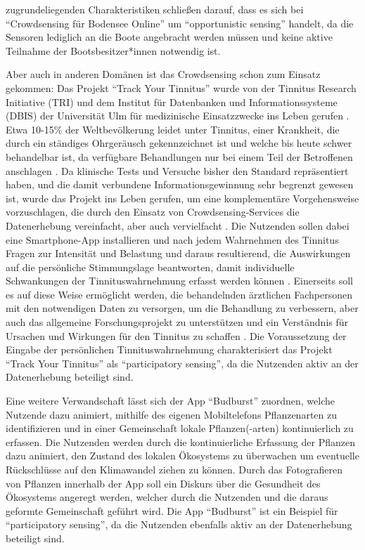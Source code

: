 zugrundeliegenden Charakteristiken schließen darauf, dass es sich bei \enquote{Crowdsensing für Bodensee Online} um \enquote{opportunistic sensing} handelt, da die Sensoren lediglich an die Boote angebracht werden müssen und keine aktive Teilnahme der Bootsbesitzer*innen notwendig ist. 

Aber auch in anderen Domänen ist das Crowdsensing schon zum Einsatz gekommen: Das Projekt \enquote{Track Your Tinnitus} wurde von der Tinnitus Research Initiative (TRI) und dem Institut für Datenbanken und Informationssysteme (DBIS) der Universität Ulm für medizinische Einsatzzwecke ins Leben gerufen \cite{Pryss2017}. Etwa 10-15\% der Weltbevölkerung leidet unter Tinnitus, einer Krankheit, die durch ein ständiges Ohrgeräusch gekennzeichnet ist und welche bis heute schwer behandelbar ist, da verfügbare Behandlungen nur bei einem Teil der Betroffenen anschlagen \cite{langguth2011review}. Da klinische Tests und Versuche bisher den Standard repräsentiert haben, und die damit verbundene Informationsgewinnung sehr begrenzt gewesen ist, wurde das Projekt ins Leben gerufen, um eine komplementäre Vorgehensweise vorzuschlagen, die durch den Einsatz von Crowdsensing-Services die Datenerhebung vereinfacht, aber auch vervielfacht \cite{pryss2015mobile}. Die Nutzenden sollen dabei eine Smartphone-App installieren und nach jedem Wahrnehmen des Tinnitus Fragen zur Intensität und Belastung und daraus resultierend, die Auswirkungen auf die persönliche Stimmungslage beantworten, damit individuelle Schwankungen der Tinnituswahrnehmung erfasst werden können \cite{pryss2015mobile}. Einerseits soll es auf diese Weise ermöglicht werden, die behandelnden ärztlichen Fachpersonen mit den notwendigen Daten zu versorgen, um die Behandlung zu verbessern, aber auch das allgemeine Forschungsprojekt zu unterstützen und ein Verständnis für Ursachen und Wirkungen für den Tinnitus zu schaffen \cite{pryss2015mobile}. Die Voraussetzung der Eingabe der persönlichen Tinnituswahrnehmung charakterisiert das Projekt \enquote{Track Your Tinnitus} als \enquote{participatory sensing}, da die Nutzenden aktiv an der Datenerhebung beteiligt sind.

Eine weitere Verwandschaft lässt sich der App \enquote{Budburst} zuordnen, welche Nutzende dazu animiert, mithilfe des eigenen Mobiltelefons Pflanzenarten zu identifizieren und in einer Gemeinschaft lokale Pflanzen(-arten) kontinuierlich zu erfassen. Die Nutzenden werden durch die kontinuierliche Erfassung der Pflanzen dazu animiert, den Zustand des lokalen Ökosystems zu überwachen um eventuelle Rückschlüsse auf den Klimawandel ziehen zu können. Durch das Fotografieren von Pflanzen innerhalb der App soll ein Diskurs über die Gesundheit des Ökosystems angeregt werden, welcher durch die Nutzenden und die daraus geformte Gemeinschaft geführt wird. Die App \enquote{Budburst} ist ein Beispiel für \enquote{participatory sensing}, da die Nutzenden ebenfalls aktiv an der Datenerhebung beteiligt sind.

